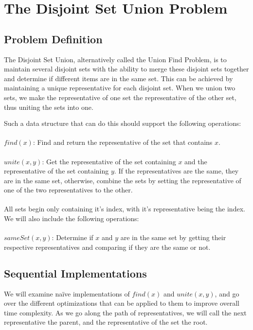 \documentclass[conference]{IEEEtran}
\begin{document}
\section{The Disjoint Set Union Problem}

\subsection{Problem Definition}
The Disjoint Set Union, alternatively called the Union Find Problem, is to maintain several disjoint sets with the ability to merge these disjoint sets together and determine if different items are in the same set. This can be achieved by maintaining a unique representative for each disjoint set. When we union two sets, we make the representative of one set the representative of the other set, thus uniting the sets into one.

Such a data structure that can do this should support the following operations: \\ \\
$find(x)$: Find and return the representative of the set that contains $x$. \\ \\
$unite(x, y)$: Get the representative of the set containing $x$ and the representative of the set containing $y$. If the representatives are the same, they are in the same set, otherwise, combine the sets by setting the representative of one of the two representatives to the other. \\ \\
All sets begin only containing it's index, with it's representative being the index. We will also include the following operations: \\ \\
$sameSet(x, y)$: Determine if $x$ and $y$ are in the same set by getting their respective representatives and comparing if they are the same or not.

\subsection{Sequential Implementations}

We will examine naïve implementations of $find(x)$ and $unite(x, y)$, and go over the different optimizations that can be applied to them to improve overall time complexity. As we go along the path of representatives, we will call the next representative the parent, and the representative of the set the root.
\end{document}

